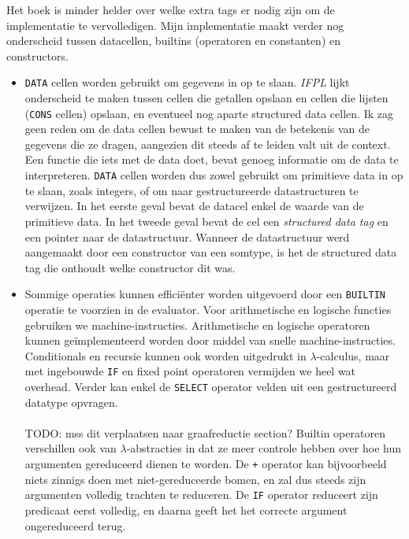 \documentclass[a4paper,10pt]{article}
\begin{document}
Het boek is minder helder over welke extra tags er nodig zijn om de implementatie te vervolledigen.
Mijn implementatie maakt verder nog onderscheid tussen datacellen, builtins (operatoren en constanten) en constructors.
\begin{itemize}
\item
  \texttt{DATA} cellen worden gebruikt om gegevens in op te slaan.
  \emph{IFPL} lijkt onderscheid te maken tussen cellen die getallen opslaan en cellen die lijsten (\texttt{CONS} cellen) opslaan, en eventueel nog aparte structured data cellen.
  Ik zag geen reden om de data cellen bewust te maken van de betekenis van de gegevens die ze dragen, aangezien dit steeds af te leiden valt uit de context.
  Een functie die iets met de data doet, bevat genoeg informatie om de data te interpreteren.
  \texttt{DATA} cellen worden dus zowel gebruikt om primitieve data in op te slaan, zoals integers, of om naar gestructureerde datastructuren te verwijzen.
  In het eerste geval bevat de datacel enkel de waarde van de primitieve data.
  In het tweede geval bevat de cel een \emph{structured data tag} en een pointer naar de datastructuur.
  Wanneer de datastructuur werd aangemaakt door een constructor van een somtype, is het de structured data tag die onthoudt welke constructor dit was.
\item
  Sommige operaties kunnen effici{\"e}nter worden uitgevoerd door een \texttt{BUILTIN} operatie te voorzien in de evaluator.
  Voor arithmetische en logische functies gebruiken we machine-instructies.
  Arithmetische en logische operatoren kunnen ge{\"i}mplementeerd worden door middel van snelle machine-instructies.
  Conditionals en recursie kunnen ook worden uitgedrukt in $\lambda$-calculus, maar met ingebouwde \texttt{IF} en fixed point operatoren vermijden we heel wat overhead.
  Verder kan enkel de \texttt{SELECT} operator velden uit een gestructureerd datatype opvragen.
  \paragraph{}
  TODO: mss dit verplaatsen naar graafreductie section?
  Builtin operatoren verschillen ook van $\lambda$-abstracties in dat ze meer controle hebben over hoe hun argumenten gereduceerd dienen te worden.
  De \texttt{+} operator kan bijvoorbeeld niets zinnigs doen met niet-gereduceerde bomen, en zal dus steeds zijn argumenten volledig trachten te reduceren.
  De \texttt{IF} operator reduceert zijn predicaat eerst volledig, en daarna geeft het het correcte argument ongereduceerd terug.

\end{itemize}
\end{document}
